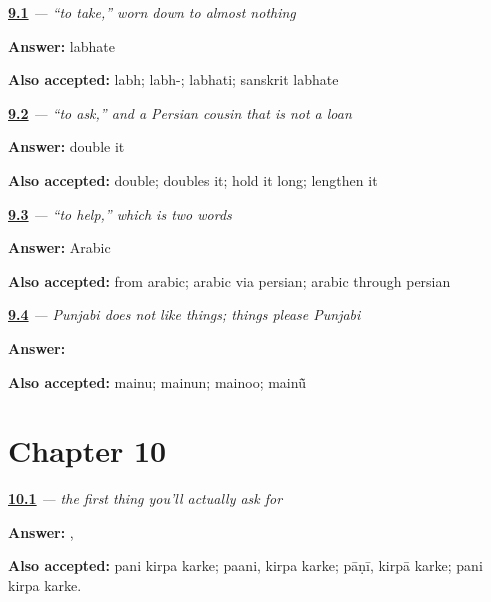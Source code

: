 \noindent\begin{minipage}[t]{\linewidth}
\raggedright
\hyperlink{review-PA-C09-laina-labhate}{\textbf{9.1}} \emph{ — “to take,” worn down to almost nothing}\par
\small \textbf{Answer:} labhate\par
\footnotesize \textbf{Also accepted:} labh; labh-; labhati; sanskrit labhate
\end{minipage}\par\medskip

\noindent\begin{minipage}[t]{\linewidth}
\raggedright
\hyperlink{review-PA-C09-puchhna-addak}{\textbf{9.2}} \emph{ — “to ask,” and a Persian cousin that is not a loan}\par
\small \textbf{Answer:} double it\par
\footnotesize \textbf{Also accepted:} double; doubles it; hold it long; lengthen it
\end{minipage}\par\medskip

\noindent\begin{minipage}[t]{\linewidth}
\raggedright
\hyperlink{review-PA-C09-madad-karna-root}{\textbf{9.3}} \emph{  — “to help,” which is two words}\par
\small \textbf{Answer:} Arabic\par
\footnotesize \textbf{Also accepted:} from arabic; arabic via persian; arabic through persian
\end{minipage}\par\medskip

\noindent\begin{minipage}[t]{\linewidth}
\raggedright
\hyperlink{review-PA-C09-pasand-dative}{\textbf{9.4}} \emph{ — Punjabi does not like things; things please Punjabi}\par
\small \textbf{Answer:} \par
\footnotesize \textbf{Also accepted:} mainu; mainun; mainoo; mainū̃
\end{minipage}\par\medskip

\section*{Chapter 10}

\noindent\begin{minipage}[t]{\linewidth}
\raggedright
\hyperlink{review-PA-C10-paani-please}{\textbf{10.1}} \emph{ — the first thing you'll actually ask for}\par
\small \textbf{Answer:} ,  \par
\footnotesize \textbf{Also accepted:} pani kirpa karke; paani, kirpa karke; pāṇī, kirpā karke; pani kirpa karke.
\end{minipage}\par\medskip

